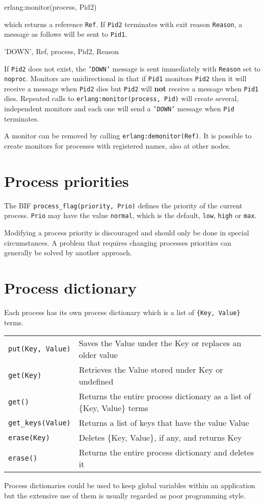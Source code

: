 \begin{erlang}
erlang:monitor(process, Pid2)
\end{erlang}

which returns a reference \texttt{Ref}. If \texttt{Pid2} terminates
with exit reason \texttt{Reason}, a message as follows will be sent to
\texttt{Pid1}.

\begin{erlang}
{'DOWN', Ref, process, Pid2, Reason}
\end{erlang}

If \texttt{Pid2} does not exist, the \texttt{'DOWN'} message is sent
immediately with \texttt{Reason} set to \texttt{noproc}. Monitors are
unidirectional in that if \texttt{Pid1} monitors \texttt{Pid2} then it
will receive a message when \texttt{Pid2} dies but \texttt{Pid2} will
\textbf{not} receive a message when \texttt{Pid1} dies. Repeated calls
to \texttt{erlang:monitor(process, Pid)} will create several,
independent monitors and each one will send a \texttt{'DOWN'} message
when \texttt{Pid} terminates.

A monitor can be removed by calling \texttt{erlang:demonitor(Ref)}. It
is possible to create monitors for processes with registered names,
also at other nodes.


\section{Process priorities}
The BIF \texttt{process\_flag(priority, Prio)} defines the priority of
the current process. \texttt{Prio} may have the value \texttt{normal},
which is the default, \texttt{low}, \texttt{high} or \texttt{max}. 

Modifying a process priority is discouraged and should only be done in 
special circumstances. A problem that requires changing processes 
priorities can generally be solved by another approach.


\section{Process dictionary}
\label{processes:dicts}
Each process has its own process dictionary which is a list of
\texttt{\{Key, Value\}} terms.

\begin{center}
\begin{tabular}{|>{\raggedright}p{79pt}|>{\raggedright}p{247pt}|}
\hline
\multicolumn{2}{|p{326pt}|}{Process dictionary BIFs}\tabularnewline
\hline
\texttt{put(Key, Value)} & Saves the Value under the Key or replaces an older value\tabularnewline
\hline
\texttt{get(Key)} & Retrieves the Value stored under Key or undefined\tabularnewline
\hline
\texttt{get()} & Returns the entire process dictionary as a list of \{Key, Value\} terms\tabularnewline
\hline
\texttt{get\_keys(Value)} & Returns a list of keys that have the value Value\tabularnewline
\hline
\texttt{erase(Key)} & Deletes \{Key, Value\}, if any, and returns Key\tabularnewline
\hline
\texttt{erase()} & Returns the entire process dictionary and deletes it\tabularnewline
\hline
\end{tabular}
\end{center}

Process dictionaries could be used to keep global variables within an application but the extensive use of them is usually regarded as poor programming style.
